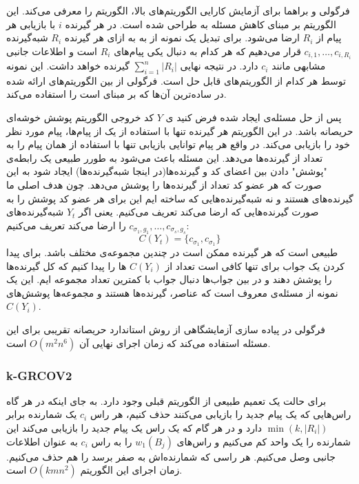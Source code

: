  \section{}
 فرگولی و براهما برای آزمایش کارایی الگوریتم‌های بالا، الگوریتم
 را معرفی می‌کند. این الگوریتم بر مبنای کاهش مسئله به
 \icod
 طراحی شده است. در 
 \picod
 هر گیرنده 
 $i$
 با بازیابی هر پیام از
 $R_i$
 ارضا می‌شود. برای تبدیل یک نمونه از
 \picod
 به
 \icod
 به ازای هر گیرنده
 $R_i$
 شبه‌گیرنده 
 $c_{i, 1}, \ldots, c_{i, {R_i}}$
 قرار می‌دهیم که هر کدام به دنبال یکی پیام‌های
 $R_i$
 است و اطلاعات جانبی مشابهی مانند
 $c_i$
 دارد. در نتیجه 
 \icod
 نهایی 
 $\sum\limits_{i = 1}^{n} |R_i|$
 گیرنده خواهد داشت. این نمونه توسط هر کدام از الگوریتم‌های
 \icod
 قابل حل است. فرگولی از بین الگوریتم‌های ارائه شده در
 \cite{25}
 ساده‌ترین آن‌ها که بر مبنای
 است را استفاده می‌کند.
 
 پس از حل مسئله‌ی
 \icod
 ایجاد شده فرض کنید ی
 $Y$
 کد خروجی الگوریتم پوشش خوشه‌ای حریصانه باشد. در این الگوریتم هر گیرنده تنها با استفاده از یک از پیام‌ها، پیام مورد نظر خود را بازیابی می‌کند. در واقع هر پیام توانایی بازیابی تنها با استفاده از همان پیام را به تعداد از گیرنده‌ها می‌دهد. این مسئله باعث می‌شود به طورر طبیعی یک رابطه‌ی "پوشش" دادن بین اعضای کد و گیرنده‌ها(در اینجا شبه‌گیرنده‌ها) ایجاد شود به این صورت که هر عضو کد تعداد از گیرنده‌ها را پوشش می‌دهد. چون هدف اصلی ما گیرنده‌های
 \picod
 هستند و نه شبه‌گیرنده‌هایی که ساخته ایم این برای هر عضو کد پوشش را به صورت گیرنده‌هایی که ارضا می‌کند تعریف می‌کنیم. یعنی اگر
 $Y_t$
 شبه‌گیرنده‌های
 $c_{\sigma_1, g_1}, \ldots, c_{\sigma_s, g_s}$
 را ارضا می‌کند تعریف می‌کنیم:
 $$C(Y_t) =\{ c_{\sigma_1}, c_{\sigma_1}\}$$
 طبیعی است که هر گیرنده ممکن است در چندین مجموعه‌ی مختلف باشد. برای پیدا کردن یک جواب برای
 \picod
 تنها کافی است تعداد از 
 $C(Y_i)$
 ها را پیدا کنیم که کل گیرنده‌ها را پوشش دهند و در بین جواب‌ها دنبال جواب با کمترین تعداد مجموعه‌ ایم. این یک نمونه از مسئله‌ی معروف
 است که عناصر، گیرنده‌ها هستند و مجموعه‌ها پوشش‌های
 $C(Y_i)$.
 
 فرگولی در پیاده سازی آزمایشگاهی از روش استاندارد حریصانه تقریبی برای این مسئله استفاده می‌کند که زمان اجرای نهایی آن
 $O(m^2 n^6)$
 است.
\subsubsection{k-GRCOV2}
برای حالت
\picodt
یک تعمیم طبیعی از الگوریتم قبلی وجود دارد. به جای اینکه در هر گاه راس‌هایی که یک پیام جدید را بازیابی می‌کنند حذف کنیم، هر راس 
$c_i$
یک شمارنده برابر
$\min(k, |R_i|)$
دارد و در هر گام که یک راس یک پیام جدید را بازیابی می‌کند این شمارنده را یک واحد کم می‌کنیم و راس‌های
$w_1(B_j)$
را به راس
$c_i$
به عنوان اطلاعات جانبی وصل می‌کنیم. هر راسی که شمارنده‌اش به صفر برسد را هم حذف می‌کنیم. زمان اجرای این الگوریتم
$O(kmn^2)$
است.

